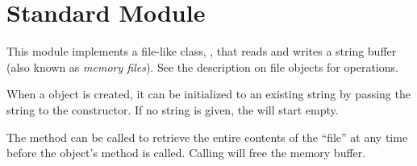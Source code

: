 \section{Standard Module }
\label{module-StringIO}


This module implements a file-like class, ,
that reads and writes a string buffer (also known as \emph{memory
files}). See the description on file objects for operations.

When a  object is created, it can be initialized
to an existing string by passing the string to the constructor.
If no string is given, the  will start empty.

The method  can be called to retrieve the entire
contents of the ``file'' at any time before the 
object's  method is called.  Calling  will
free the memory buffer.
